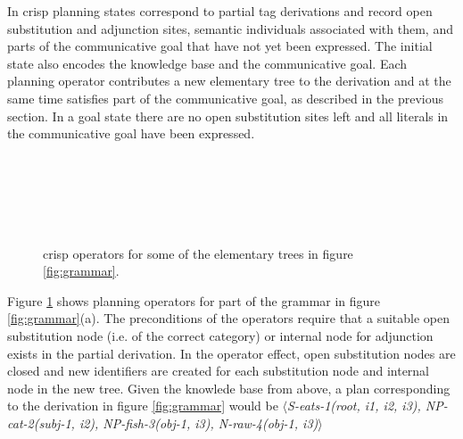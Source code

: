 In {\sc crisp} planning states correspond to partial {\sc tag} derivations and record open substitution and adjunction sites, semantic individuals associated with them, and parts of the communicative goal that have not yet been expressed.  The initial state also encodes the knowledge base and the communicative goal. Each planning operator contributes a new elementary tree to the derivation and at the same time satisfies part of the communicative goal, as described in the previous section. In a goal state there are no open substitution sites left and all literals in the communicative goal have been expressed. 
\begin{figure}[t]
\begin{center}
\\\smallskip

\\ \smallskip


\\\smallskip
\end{center}
\caption{\label{fig:crisp-operators} {\sc crisp} operators for some of the elementary trees in figure \ref{fig:grammar}.}
\end{figure}


Figure \ref{fig:crisp-operators} shows planning operators for part of the grammar in figure \ref{fig:grammar}(a).
The preconditions of the operators require that a suitable open substitution node (i.e. of the correct category) or internal node for adjunction exists in the partial derivation. In the operator effect, open substitution nodes are closed and new identifiers are created for each substitution node and internal node in the new tree. Given the knowlede base from above, a plan corresponding to the derivation in figure \ref{fig:grammar} would be $\langle${\it S-eats-1(root, i1, i2, i3), NP-cat-2(subj-1, i2), NP-fish-3(obj-1, i3), N-raw-4(obj-1, i3)}$\rangle$

